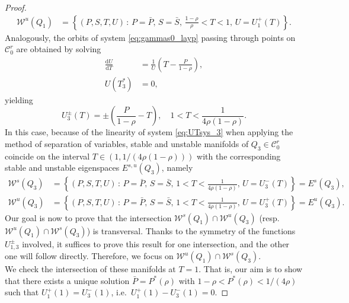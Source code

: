 \documentclass[10pt,a4paper]{amsart}
\begin{document}
\begin{proof}
\begin{equation}
\begin{aligned}
    \mathcal{W}^{u} (Q_1) &= \left\{ (P, S, T, U) \, : \, P=\bar{P}, \, S=\bar{S},\, \frac{1-\rho}{\rho}<T<1, \,  U=U_1^+(T)  \right\}.
\end{aligned}
\end{equation}
Analogously, the orbits of system \eqref{eq:gammas0_layp} passing through points on $\mathcal{C}_0^r$ are obtained by solving
\begin{equation} \label{eq:UTsys_3}
\begin{aligned}
    \frac{\text{d}U}{\text{d}T} &= \frac{1}{U} \left(T - \frac{P}{1 - \rho} \right), \\
    U(T_3^\ast) &= 0,
\end{aligned}
\end{equation}
yielding
\begin{equation}
    U_3^\pm (T) = \pm \left(\frac{P}{1-\rho } - T \right),\quad 1 < T < \frac{1}{4 \rho  (1-\rho )}.
\end{equation}
In this case, because of the linearity of system \eqref{eq:UTsys_3} when applying the method of separation of variables, stable and unstable manifolds of $Q_3 \in \mathcal{C}_0^r$ coincide on the interval $T \in \left(1, 1/(4 \rho  (1-\rho ))\right)$ with the corresponding stable and unstable eigenspaces $E^{s,u}(Q_3)$, namely
\begin{equation}
\begin{aligned}
    \mathcal{W}^{s} (Q_3) &= \left\{ (P, S, T, U) \, : \, P=\bar{P}, \, S=\bar{S},\, 1<T<\frac{1}{4 \rho  (1-\rho )}, \,  U=U_3^-(T)  \right\} = E^{s} (Q_3), \\
    \mathcal{W}^{u} (Q_3) &= \left\{ (P, S, T, U) \, : \, P=\bar{P}, \, S=\bar{S},\, 1<T<\frac{1}{4 \rho  (1-\rho )}, \,  U=U_3^+(T)  \right\} = E^{u} (Q_3).
\end{aligned}
\end{equation}
Our goal is now to prove that the intersection $\mathcal{W}^{s}(Q_1) \cap \mathcal{W}^{u}(Q_3)$ (resp.~$\mathcal{W}^{u}(Q_1) \cap \mathcal{W}^{s}(Q_3)$) is transversal. Thanks to the symmetry of the functions $U_{1,3}^\pm$ involved, it suffices to prove this result for one intersection, and the other one will follow directly. Therefore, we focus on $\mathcal{W}^{u}(Q_1) \cap \mathcal{W}^{s}(Q_3)$.\\
We check the intersection of these manifolds at $T=1$. 
That is, our aim is to show that there exists a unique solution $\bar{P}=P^\ast(\rho)$ with $1-\rho < P^\ast(\rho) < 1/(4\rho)$ such that $U_1^+(1)=U_3^-(1)$, i.e.~$U_1^+(1)-U_3^-(1)=0$. 

\end{proof}
\end{document}
